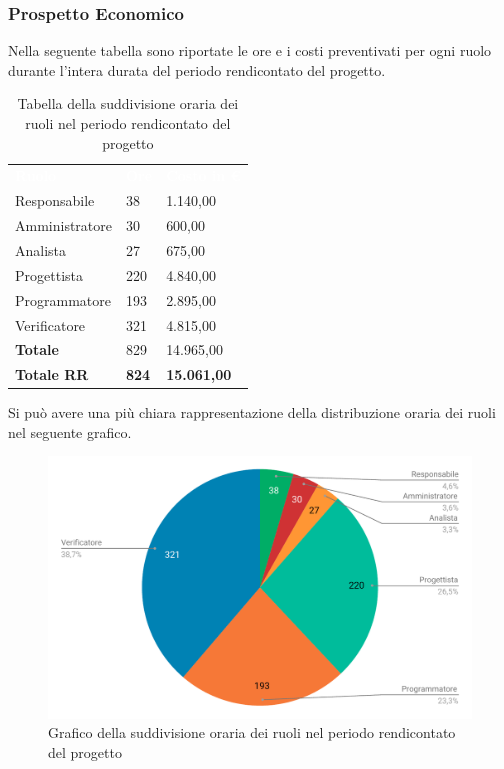 \subsubsection{Prospetto Economico}
Nella seguente tabella sono riportate le ore e i costi preventivati per ogni ruolo durante l'intera durata del periodo rendicontato del progetto.


\begin{table}[H]	
	\begin{center}
	    \begin{tabular}{C{4cm}C{1cm}C{3,5cm}}
			\textcolor{white}{\textbf{Ruolo}} & \textcolor{white}{\textbf{Ore}} & \textcolor{white}{\textbf{Costo in €}}
			\\
			Responsabile & 38 & 1.140,00 \\
			Amministratore & 30 & 600,00 \\
			Analista & 27 & 675,00 \\
			Progettista & 220 & 4.840,00 \\
			Programmatore & 193 & 2.895,00 \\
			Verificatore & 321 & 4.815,00 \\
			\textbf{Totale} & 829 & 14.965,00 \\
			\textbf{Totale RR} & \textbf{824} & \textbf{15.061,00} \\
		\end{tabular}
	    \caption{Tabella della suddivisione oraria dei ruoli nel periodo rendicontato del progetto} \label{tab:tabellaRuoliTotale} 
	\end{center}
\end{table}


Si può avere una più chiara rappresentazione della distribuzione oraria dei ruoli nel seguente grafico.

\begin{figure}[H]
	\includegraphics[width=1\linewidth]{Preventivo/grafici/TR2.pdf}
	\caption{Grafico della suddivisione oraria dei ruoli nel periodo rendicontato del progetto}
\end{figure}

